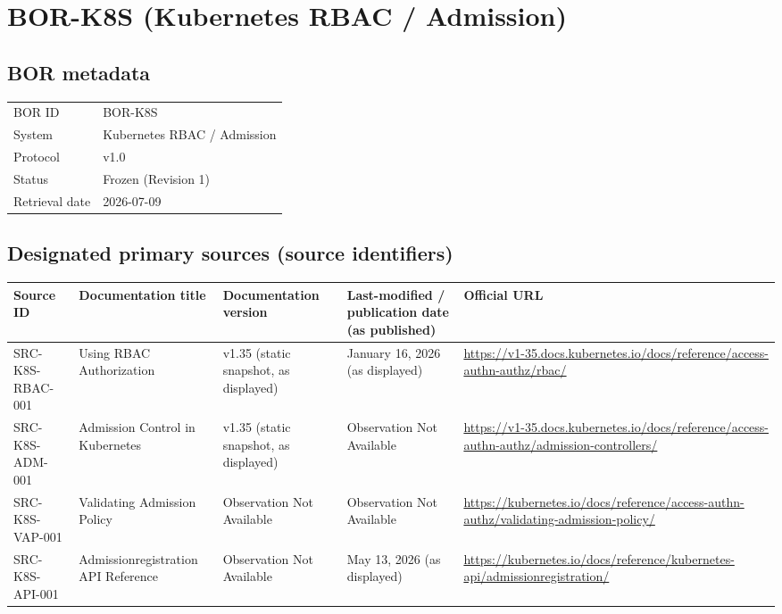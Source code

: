 \documentclass[11pt]{article}
\begin{document}
\section*{BOR-K8S (Kubernetes RBAC / Admission)}
\subsection*{BOR metadata}
\begin{tabular}{@{}L{2.2in}L{4.2in}@{}}
\toprule
BOR ID & BOR-K8S\\
System & Kubernetes RBAC / Admission\\
Protocol & v1.0\\
Status & Frozen (Revision 1)\\
Retrieval date & 2026-07-09\\
\bottomrule
\end{tabular}

\subsection*{Designated primary sources (source identifiers)}
\begin{longtable}{@{}L{1.6in}L{2.9in}L{1.0in}L{0.9in}L{1.9in}@{}}
\toprule
Source ID & Documentation title & Documentation version & Last-modified / publication date (as published) & Official URL\\
\midrule
\endhead
SRC-K8S-RBAC-001 & Using RBAC Authorization & v1.35 (static snapshot, as displayed) & January 16, 2026 (as displayed) & \url{https://v1-35.docs.kubernetes.io/docs/reference/access-authn-authz/rbac/}\\
SRC-K8S-ADM-001 & Admission Control in Kubernetes & v1.35 (static snapshot, as displayed) & Observation Not Available & \url{https://v1-35.docs.kubernetes.io/docs/reference/access-authn-authz/admission-controllers/}\\
SRC-K8S-VAP-001 & Validating Admission Policy & Observation Not Available & Observation Not Available & \url{https://kubernetes.io/docs/reference/access-authn-authz/validating-admission-policy/}\\
SRC-K8S-API-001 & Admissionregistration API Reference & Observation Not Available & May 13, 2026 (as displayed) & \url{https://kubernetes.io/docs/reference/kubernetes-api/admissionregistration/}\\
\bottomrule
\end{longtable}
\end{document}
